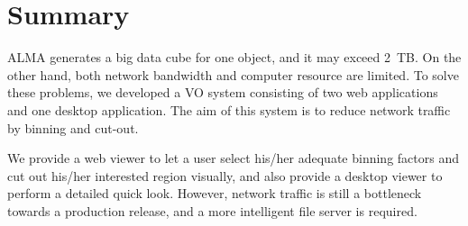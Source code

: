 \section{Summary}

ALMA generates a big data cube for one object, and it may exceed 2\ TB. On the other hand, both network bandwidth and computer resource are limited. To solve these problems, we developed a VO system consisting of two web applications and one desktop application. The aim of this system is to reduce network traffic by binning and cut-out.

We provide a web viewer to let a user select his/her adequate binning factors and cut out his/her interested region visually, and also provide a desktop viewer to perform a detailed quick look. However, network traffic is still a bottleneck towards a production release, and a more intelligent file server is required.


